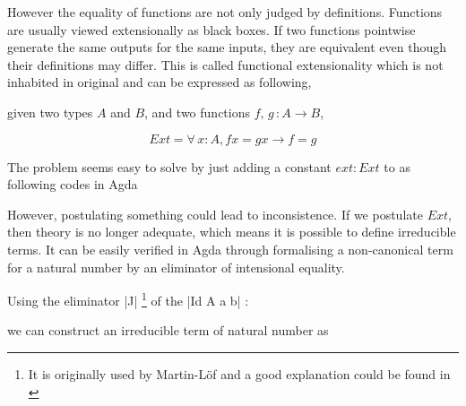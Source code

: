


However the equality of functions are not only judged  by
definitions. Functions are
usually viewed extensionally as black boxes. If two functions pointwise
generate the same outputs for the same inputs, they are equivalent
even though their definitions may differ. This is called
functional extensionality which is not inhabited \cite{alti:lics99} in original
\itt{} and can be expressed as following,

given two types $A$ and $B$, and two functions $f,\,g\,\colon A \to B$,

\[Ext = \forall\, x\colon A, f x = g x \to f = g\]

The problem seems easy to solve by just adding a constant $ext : Ext$
to \itt{} as following codes in Agda




However, postulating something could lead to inconsistence. If we
postulate $Ext$, then theory is no longer adequate, which means it is possible to define irreducible terms. 
It can be easily verified in Agda through formalising a non-canonical
term for a natural number by an eliminator of intensional equality. 

Using the eliminator |J| \footnote{It is originally
  used by Martin-L\"{o}f \cite{nor:90} and a good explanation could be
found in \cite{ngk:11}}  of the |Id A a b| :



we can construct an irreducible term of natural number as


